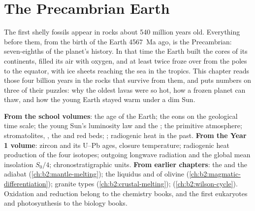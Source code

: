 \chapter{The Precambrian Earth}\label{ch:b2:precambrian-earth}

The first shelly fossils appear in rocks about 540 million years old. Everything before them, from
the birth of the Earth \qty{4567}{Ma} ago, is the Precambrian: seven-eighths of the planet's
history. In that time the Earth built the cores of its continents, filled its air with oxygen,
and at least twice froze over from the poles to the equator, with ice sheets reaching the sea
in the tropics. This chapter reads those four billion years in the rocks that survive from them,
and puts numbers on three of their puzzles: why the oldest lavas were so hot, how a frozen
planet can thaw, and how the young Earth stayed warm under a dim Sun.

\begin{recall}
\textbf{From the school volumes}: the age of the Earth; the eons on the geological time scale;
the young Sun's luminosity law and the ; the primitive atmosphere;
stromatolites, , the  and red beds; ;
radiogenic heat in the past. \textbf{From the Year 1 volume}: zircon and its U--Pb ages,
closure temperature; radiogenic heat production of the four isotopes; outgoing longwave
radiation and the global mean insolation $S_0/4$; chronostratigraphic units.
\textbf{From earlier chapters}: the  and the adiabat
(\cref{ch:b2:mantle-melting}); the liquidus and  of olivine
(\cref{ch:b2:magmatic-differentiation}); granite types (\cref{ch:b2:crustal-melting});
 (\cref{ch:b2:wilson-cycle}). Oxidation and reduction belong to the chemistry
books, and the first eukaryotes and photosynthesis to the biology books.
\end{recall}

